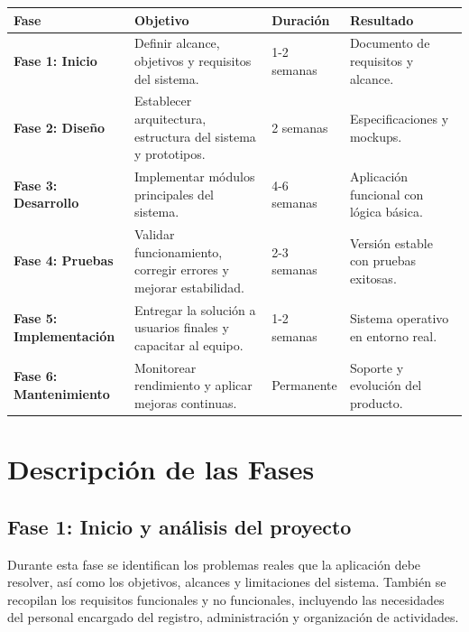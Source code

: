\documentclass[11pt,a4paper]{article}
\begin{document}
	\begin{table}[H]
		\centering
		\renewcommand{\arraystretch}{1.4}
		\begin{tabularx}{\textwidth}{|>{\bfseries}p{}|X|p{}|p{}|}
			\hline
			\rowcolor{companyaccent}
			\textcolor{companyblue}{\textbf{Fase}} & \textcolor{companyblue}{\textbf{Objetivo}} & \textcolor{companyblue}{\textbf{Duración}} & \textcolor{companyblue}{\textbf{Resultado}} \\
			\hline
			Fase 1: Inicio & Definir alcance, objetivos y requisitos del sistema. & 1-2 semanas & Documento de requisitos y alcance. \\
			\hline
			Fase 2: Diseño & Establecer arquitectura, estructura del sistema y prototipos. & 2 semanas & Especificaciones y mockups. \\
			\hline
			Fase 3: Desarrollo & Implementar módulos principales del sistema. & 4-6 semanas & Aplicación funcional con lógica básica. \\
			\hline
			Fase 4: Pruebas & Validar funcionamiento, corregir errores y mejorar estabilidad. & 2-3 semanas & Versión estable con pruebas exitosas. \\
			\hline
			Fase 5: Implementación & Entregar la solución a usuarios finales y capacitar al equipo. & 1-2 semanas & Sistema operativo en entorno real. \\
			\hline
			Fase 6: Mantenimiento & Monitorear rendimiento y aplicar mejoras continuas. & Permanente & Soporte y evolución del producto. \\
			\hline
		\end{tabularx}
	\end{table}
	
	\section{Descripción de las Fases}
	
	\subsection{Fase 1: Inicio y análisis del proyecto}
	Durante esta fase se identifican los problemas reales que la aplicación debe resolver, así como los objetivos, alcances y limitaciones del sistema. También se recopilan los requisitos funcionales y no funcionales, incluyendo las necesidades del personal encargado del registro, administración y organización de actividades.\par
	
\end{document}
